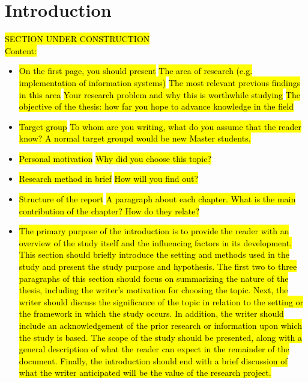 \newpage
\section{Introduction}
\hl{SECTION UNDER CONSTRUCTION}\\
\iffalse
\hl{Content:}
\begin{itemize}
    \item \hl{On the first page, you should present}
        \subitem \hl{The area of research (e.g. implementation of information systems)}
        \subitem \hl{The most relevant previous findings in this area}
        \subitem \hl{Your research problem and why this is worthwhile studying}
        \subitem \hl{The objective of the thesis: how far you hope to advance knowledge in the field}
    \item \hl{Target group}
        \subitem \hl{To whom are you writing, what do you assume that the reader know? A normal target groupd would be new Master students.}
    \item \hl{Personal motivation}
        \subitem \hl{Why did you choose this topic?}
    \item \hl{Research method in brief}
        \subitem \hl{How will you find out?}
    \item \hl{Structure of the report}
        \subitem \hl{A paragraph about each chapter. What is the main contribution of the chapter? How do they relate?}
\end{itemize}

\begin{itemize}
    \item \hl{The primary purpose of the introduction is to provide the reader with an overview of the study itself and the influencing factors in its development. This section should briefly introduce the setting and methods used in the study and present the study purpose and hypothesis. The first two to three paragraphs of this section should focus on summarizing the nature of the thesis, including the writer's motivation for choosing the topic. Next, the writer should discuss the significance of the topic in relation to the setting or the framework in which the study occurs. In addition, the writer should include an acknowledgement of the prior research or information upon which the study is based. The scope of the study should be presented, along with a general description of what the reader can expect in the remainder of the document. Finally, the introduction should end with a brief discussion of what the writer anticipated will be the value of the research project. }
\end{itemize}

